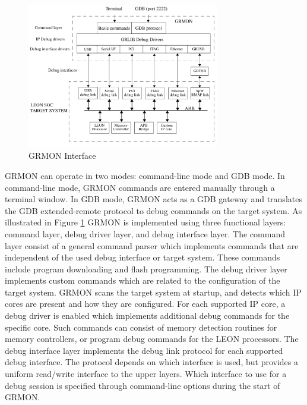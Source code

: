  \begin{figure}[ht]
    \centering
    \includegraphics[width=0.75\textwidth]{figures/others/grmon_ex.png}
    \caption{GRMON  Interface }
    \label{fig:grmon_int}
\end{figure}
GRMON can operate in two modes: command-line mode and GDB mode. In command-line mode, GRMON
commands are entered manually through a terminal window. In GDB mode, GRMON acts as a GDB gateway
and translates the GDB extended-remote protocol to debug commands on the target system. As illustrated in Figure \ref{fig:grmon_int} GRMON is implemented using three functional layers: command layer, debug driver layer, and debug interface layer. The command layer consist of a general command parser which implements commands that are independent
of the used debug interface or target system. These commands include program downloading and flash programming.
The debug driver layer implements custom commands which are related to the configuration of the target system. 
GRMON scans the target system at startup, and detects which IP cores are present and how they are configured. For each supported IP core, a debug driver is enabled which implements additional debug commands for the specific core. Such commands can consist of memory detection routines for memory controllers, or program debug commands for the LEON processors. The debug interface layer implements the debug link protocol for each supported debug interface. The protocol depends on which interface is used, but provides a uniform read/write interface to the upper layers. Which
interface to use for a debug session is specified through command-line options during the start of GRMON.



